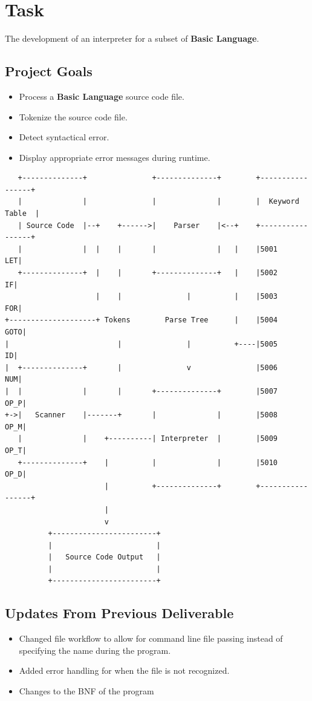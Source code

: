 \documentclass{report}
\begin{document}


\section*{Task}
The development of an interpreter for a subset of \textbf{Basic Language}. 

\vspace{0.5cm}

\subsection*{Project Goals}
\begin{itemize}
	\item Process a \textbf{Basic Language} source code file. 
	\item Tokenize the source code file. 
	\item Detect syntactical error.
	\item Display appropriate error messages during runtime. 
\end{itemize}
\begin{verbatim}
   +--------------+               +--------------+        +-----------------+
   |              |               |              |        |  Keyword Table  |
   | Source Code  |--+    +------>|    Parser    |<--+    +-----------------+
   |              |  |    |       |              |   |    |5001          LET|
   +--------------+  |    |       +--------------+   |    |5002           IF|
                     |    |               |          |    |5003          FOR|
+--------------------+ Tokens        Parse Tree      |    |5004         GOTO|
|                         |               |          +----|5005           ID|
|  +--------------+       |               v               |5006          NUM|
|  |              |       |       +--------------+        |5007         OP_P|
+->|   Scanner    |-------+       |              |        |5008         OP_M|
   |              |    +----------| Interpreter  |        |5009         OP_T|
   +--------------+    |          |              |        |5010         OP_D|
                       |          +--------------+        +-----------------+
                       |
                       v
          +------------------------+
          |                        |
          |   Source Code Output   |
          |                        |
          +------------------------+
\end{verbatim}
\subsection*{Updates From Previous Deliverable}
\begin{itemize}
	\item Changed file workflow to allow for command line file passing instead of specifying the name during the program.
	\item Added error handling for when the file is not recognized.
	\item Changes to the BNF of the program
\end{itemize}
\end{document}
